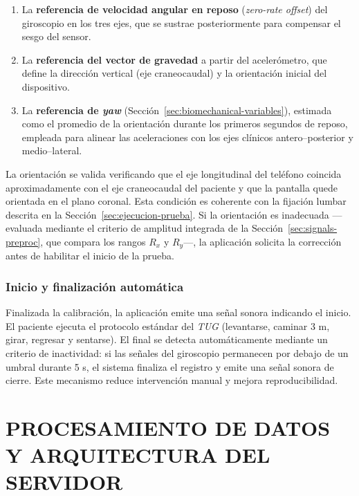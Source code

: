 \documentclass[12pt]{report}
\begin{document}
\begin{justify}
    \begin{enumerate}
        \item La \textbf{referencia de velocidad angular en reposo} (\textit{zero-rate offset}) del giroscopio en los tres ejes, que se sustrae posteriormente para compensar el sesgo del sensor.
        \item La \textbf{referencia del vector de gravedad} a partir del acelerómetro, que define la dirección vertical (eje craneocaudal) y la orientación inicial del dispositivo.
        \item La \textbf{referencia de \textit{yaw}} (Sección~\ref{sec:biomechanical-variables}), estimada como el promedio de la orientación durante los primeros segundos de reposo, empleada para alinear las aceleraciones con los ejes clínicos antero--posterior y medio--lateral.
    \end{enumerate}

    La orientación se valida verificando que el eje longitudinal del teléfono coincida aproximadamente con el eje craneocaudal del paciente y que la pantalla quede orientada en el plano coronal. Esta condición es coherente con la fijación lumbar descrita en la Sección~\ref{sec:ejecucion-prueba}. Si la orientación es inadecuada —evaluada mediante el criterio de amplitud integrada de la Sección~\ref{sec:signals-preproc}, que compara los rangos $R_x$ y $R_y$—, la aplicación solicita la corrección antes de habilitar el inicio de la prueba.

    \subsection{Inicio y finalización automática}

    Finalizada la calibración, la aplicación emite una señal sonora indicando el inicio. El paciente ejecuta el protocolo estándar del \textit{TUG} (levantarse, caminar 3 m, girar, regresar y sentarse). El final se detecta automáticamente mediante un criterio de inactividad: si las señales del giroscopio permanecen por debajo de un umbral durante 5 s, el sistema finaliza el registro y emite una señal sonora de cierre. Este mecanismo reduce intervención manual y mejora reproducibilidad.



    \chapter{PROCESAMIENTO DE DATOS Y ARQUITECTURA DEL SERVIDOR}
    \label{ch:server-processing}


\end{justify}
\end{document}
